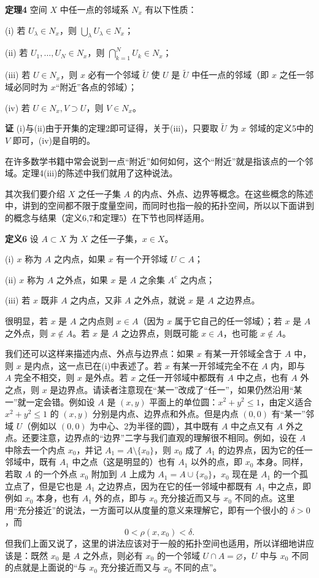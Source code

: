 \noindent\textbf{定理4}\quad
空间 $X$ 中任一点的邻域系 $N_x$ 有以下性质：

(i) 若 $U_\lambda\in N_x$，则 $\bigcup_\lambda U_\lambda\in N_x$；

(ii) 若 $U_1,\ldots,U_N\in N_x$，则 $\bigcap_{k=1}^N U_k\in N_x$；

(iii) 若 $U\in N_x$，则 $x$ 必有一个邻域 $\widetilde U$ 使 $U$ 是 $\widetilde U$ 中任一点的邻域（即 $x$ 之任一邻域必同时为 $x$“附近”各点的邻域）；

(iv) 若 $U\in N_x,V\supset U$，则 $V\in N_x$。

\noindent\textbf{证}\quad
(i)与(ii)由于开集的定理2即可证得，关于(iii)，只要取 $\widetilde U$ 为 $x$ 邻域的定义5中的 $V$ 即可，(iv)是自明的。

在许多数学书籍中常会说到一点“附近”如何如何，这个“附近”就是指该点的一个邻域。定理4(iii)的陈述中我们就用了这种说法。

其次我们要介绍 $X$ 之任一子集 $A$ 的内点、外点、边界等概念。在这些概念的陈述中，讲到的空间都不限于度量空间，而同时也指一般的拓扑空间，所以以下面讲到的概念与结果（定义6,7和定理5）在下节也同样适用。

\noindent\textbf{定义6}\quad
设 $A\subset X$ 为 $X$ 之任一子集，$x\in X$。

(i) $x$ 称为 $A$ 之内点，如果 $x$ 有一个开邻域 $U\subset A$；

(ii) $x$ 称为 $A$ 之外点，如果 $x$ 是 $A$ 之余集 $A^c$ 之内点；

(iii) 若 $x$ 既非 $A$ 之内点，又非 $A$ 之外点，就说 $x$ 是 $A$ 之边界点。

很明显，若 $x$ 是 $A$ 之内点则 $x\in A$（因为 $x$ 属于它自己的任一邻域）；若 $x$ 是 $A$ 之外点，则 $x\notin A$。若 $x$ 是 $A$ 之边界点，则既可能 $x\in A$，也可能 $x\notin A$。

我们还可以这样来描述内点、外点与边界点：如果 $x$ 有某一开邻域全含于 $A$ 中，则 $x$ 是内点，这一点已在(i)中表述了。若 $x$ 有某一开邻域完全不在 $A$ 内，即与 $A$ 完全不相交，则 $x$ 是外点。若 $x$ 之任一开邻域中都既有 $A$ 中之点，也有 $A$ 外之点，则 $x$ 是边界点。请读者注意现在“某一”改成了“任一”，如果仍然沿用“某一”就一定会错。例如设 $A$ 是 $(x,y)$ 平面上的单位圆：$x^2+y^2\le1$，由定义适合 $x^2+y^2\le1$ 的 $(x,y)$ 分别是内点、边界点和外点。但是内点 $(0,0)$ 有“某一”邻域 $U$（例如以 $(0,0)$ 为中心、2为半径的圆），其中既有 $A$ 中之点又有 $A$ 外之点。还要注意，边界点的“边界”二字与我们直观的理解很不相同。例如，设在 $A$ 中除去一个内点 $x_0$，并记 $A_1=A\setminus\{x_0\}$，则 $x_0$ 成了 $A_1$ 的边界点，因为它的任一邻域中，既有 $A_1$ 中之点（这是明显的）也有 $A_1$ 以外的点，即 $x_0$ 本身。同样，若取 $A$ 的一个外点 $x_0$ 附加到 $A$ 上成为 $A_1=A\cup\{x_0\}$，$x_0$ 现在是 $A_1$ 的一个孤立点了，但是它也是 $A_1$ 之边界点，因为在它的任一邻域中都既有 $A_1$ 中之点，即例如 $x_0$ 本身，也有 $A_1$ 外的点，即与 $x_0$ 充分接近而又与 $x_0$ 不同的点。这里用“充分接近”的说法，一方面可以从度量的意义来理解它，即有一个很小的 $\delta>0$，而
\[
 0<\rho(x,x_0)<\delta.
\]
但我们上面又说了，这里的讲法应该对于一般的拓扑空间也适用，所以详细地讲应该是：既然 $x_0$ 是 $A$ 之外点，则必有 $x_0$ 的一个邻域 $U\cap A=\varnothing$，$U$ 中与 $x_0$ 不同的点就是上面说的“与 $x_0$ 充分接近而又与 $x_0$ 不同的点”。

